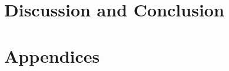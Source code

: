 \documentclass[oneside]{book}
\begin{document}
\epigraphhead[450]{}
\part{Discussion and Conclusion}



\renewcommand\bibname{References}


\epigraphhead[450]{}
\part{Appendices}

\end{document}
